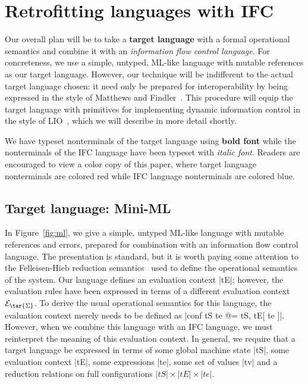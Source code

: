 \section{Retrofitting languages with IFC}
\label{sec:retrofit}

Our overall plan will be to take a \textbf{{\color{red} target language}} with a formal
operational semantics and combine it with an \textit{{\color{blue} information
flow control language}}.  For concreteness, we use a simple, untyped,
ML-like language with mutable references as our target language.
However, our technique will be indifferent to the actual target language
chosen: it need only be prepared for interoperability by being expressed
in the style of Matthews and
Findler~\cite{Matthews:2007:OSM:1190216.1190220}.  This procedure will
equip the target language with primitives for implementing dynamic
information control in the style of LIO~\cite{lio}, which we will
describe in more detail shortly.

We have typeset nonterminals of the target language using \textbf{{\color{red}
bold font}} while the nonterminals of the IFC language have been typeset
with \textit{{\color{blue} italic font}}.  Readers are encouraged to view
a color copy of this paper, where target language nonterminals are colored red
while IFC language nonterminals are colored blue.

\subsection{Target language: Mini-ML}

In Figure~\ref{fig:ml}, we give a simple, untyped ML-like language with
mutable references and errors, prepared for combination with an
information flow control language.  The presentation is standard, but it
is worth paying some attention to the Felleisen-Hieb reduction
semantics~\cite{Felleisen:1992:RRS:136293.136297} used to define the
operational semantics of the system.  Our language defines an evaluation
context |tE|; however, the evaluation rules have been expressed in terms
of a different evaluation context $\mathcal{E}_{\tar{\Sigma}}$.  To
derive the usual operational semantics for this language, the evaluation
context merely needs to be defined as |conf tS te @= tS, tE[ te ]|.
However, when we combine this language with an IFC language, we must
reinterpret the meaning of this evaluation context.
In general, we require that a target language be expressed in terms
of some global machine state |tS|, some evaluation context |tE|,
some expressions |te|, some set of values |tv| and a reduction
relations on full configurations $|tS| \times |tE| \times |te|$.

